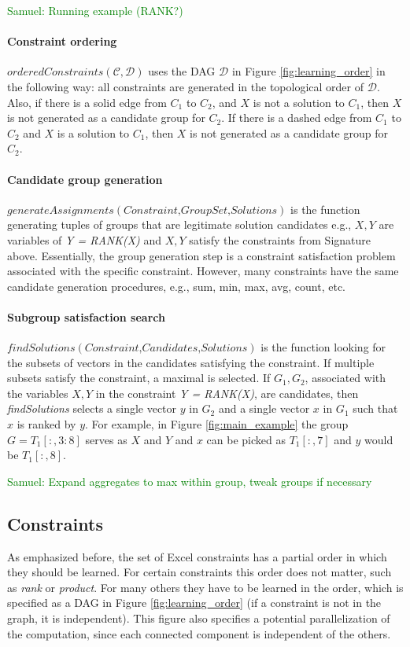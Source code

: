 \documentclass{ecai}
\newcommand{\samuel}[1]{\textcolor{green}{{\sc Samuel:} #1}\xspace}
\newcommand{\constraints}{\ensuremath{\mathcal{C}}\xspace}
\newcommand{\format}[1]{\textit{#1}\xspace}
\newcommand{\generategroups}{\format{generateAssignments}}
\newcommand{\findassignment}{\format{findSolutions}}
\newcommand{\constrainttorder}{\format{orderedConstraints}}
\newcommand{\CSignature}{Signature\xspace}
\newcommand{\dependencies}{\ensuremath{\mathcal{D}}\xspace}
\begin{document}
\samuel{Running example (RANK?)}
\paragraph{Constraint ordering} $\constrainttorder(\constraints,\dependencies)$ uses the DAG \dependencies in Figure \ref{fig:learning_order} in the following way: all constraints are generated in the topological order of \dependencies. Also, if there is a solid edge from $C_1$ to $C_2$, and $X$ is not a solution to $C_1$, then $X$ is not generated as a candidate group for $C_2$. If there is a dashed edge from $C_1$ to $C_2$ and $X$ is a solution to $C_1$, then $X$ is not generated as a candidate group for $C_2$.

\paragraph{Candidate group generation} $\generategroups(\textit{Constraint,GroupSet,Solutions})$ is the function generating tuples of groups that are legitimate solution candidates e.g., $X,Y$ are variables of \textit{Y = RANK(X)} and $X,Y$ satisfy the constraints from \CSignature above. Essentially, the group generation step is a constraint satisfaction problem associated with the specific constraint. However, many constraints have the same candidate generation procedures, e.g., sum, min, max, avg, count, etc.

\paragraph{Subgroup satisfaction search} $\findassignment(\textit{Constraint,Candidates,Solutions})$ is the function looking for the subsets of vectors in the candidates satisfying the constraint. If multiple subsets satisfy the constraint, a maximal is selected. If $G_1,G_2$, associated with the variables $X,Y$ in the constraint \textit{Y = RANK(X)}, are candidates, then \findassignment selects a single vector $y$ in $G_2$ and a single vector $x$ in $G_1$ such that $x$ is ranked by $y$. For example, in Figure \ref{fig:main_example} the group $G = T_1[{:},3{:}8]$ serves as $X$ and $Y$ and $x$ can be picked as $T_1[{:},7]$ and $y$ would be $T_1[{:},8]$.

\samuel{Expand aggregates to max within group, tweak groups if necessary}

\subsection{Constraints}
As emphasized before, the set of Excel constraints has a partial order in which they should be learned. For certain constraints this order does not matter, such as \textit{rank} or \textit{product}. For many others they have to be learned in the order, which is specified as a DAG in Figure \ref{fig:learning_order} (if a constraint is not in the graph, it is independent). This figure also specifies a potential parallelization of the computation, since each connected component is independent of the others.
\end{document}
